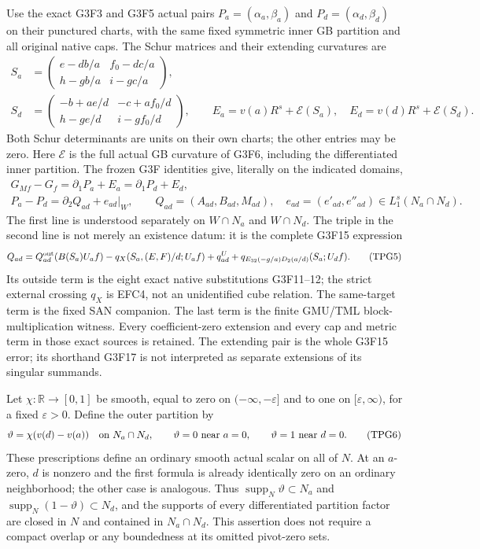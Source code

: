 Use the exact G3F3 and G3F5 actual pairs $P_a=(\alpha_a,\beta_a)$
and $P_d=(\alpha_d,\beta_d)$ on their punctured charts, with the
same fixed symmetric inner GB partition and all original native
caps.  The Schur matrices and their extending curvatures are
\[
 \begin{split}
 S_a&=\begin{pmatrix}
 e-db/a&f_0-dc/a\\h-gb/a&i-gc/a
 \end{pmatrix},\\
 S_d&=\begin{pmatrix}
 -b+ae/d&-c+af_0/d\\h-ge/d&i-gf_0/d
 \end{pmatrix},\qquad
 E_a=v(a)R^s+\mathcal E(S_a),\quad
 E_d=v(d)R^s+\mathcal E(S_d).
 \end{split}
 \tag{TPG3}
\]
Both Schur determinants are units on their own charts; the other
entries may be zero.  Here $\mathcal E$ is the full actual GB
curvature of G3F6, including the differentiated inner partition.
The frozen G3F identities give, literally on the indicated domains,
\[
 \begin{gathered}
 G_{Mf}-G_f=\partial_1P_a+E_a
               =\partial_1P_d+E_d,\\
 P_a-P_d=\partial_2 Q_{ad}+e_{ad}|_W,\qquad
 Q_{ad}=(A_{ad},B_{ad},M_{ad}),
 \quad e_{ad}=(e'_{ad},e''_{ad})\in L_1^s(N_a\cap N_d).
 \end{gathered}
 \tag{TPG4}
\]
The first line is understood separately on $W\cap N_a$ and
$W\cap N_d$.  The triple in the second line is not merely an
existence datum: it is the complete G3F15 expression
\[
 Q_{ad}=Q^{\rm out}_{ad}(B(S_a)U_af)
       -q_X(S_a,(E,F)/d;U_af)+q^U_{ad}
       +q_{E_{32}(-g/a)D_2(a/d)}(S_a;U_df).
 \tag{TPG5}
\]
Its outside term is the eight exact native substitutions G3F11--12;
the strict external crossing $q_X$ is EFC4, not an unidentified
cube relation.  The same-target term is the fixed SAN companion.
The last term is the finite GMU/TML block-multiplication witness.
Every coefficient-zero extension and every cap and metric term
in those exact sources is retained.  The extending pair is the
whole G3F15 error; its shorthand G3F17 is not interpreted as
separate extensions of its singular summands.

Let $\chi:\mathbb R\to[0,1]$ be smooth, equal to zero on
$(-\infty,-\varepsilon]$ and to one on $[\varepsilon,\infty)$,
for a fixed $\varepsilon>0$.  Define the outer partition by
\[
 \vartheta=\chi(v(d)-v(a))\quad\hbox{on }N_a\cap N_d,
 \qquad \vartheta=0\hbox{ near }a=0,
 \qquad \vartheta=1\hbox{ near }d=0.
 \tag{TPG6}
\]
These prescriptions define an ordinary smooth actual scalar on
all of $N$.  At an $a$-zero, $d$ is nonzero and the first formula
is already identically zero on an ordinary neighborhood; the
other case is analogous.  Thus
$\operatorname{supp}_N\vartheta\subset N_a$ and
$\operatorname{supp}_N(1-\vartheta)\subset N_d$, and the supports
of every differentiated partition factor are closed in $N$ and
contained in $N_a\cap N_d$.  This assertion does not require a
compact overlap or any boundedness at its omitted pivot-zero sets.

